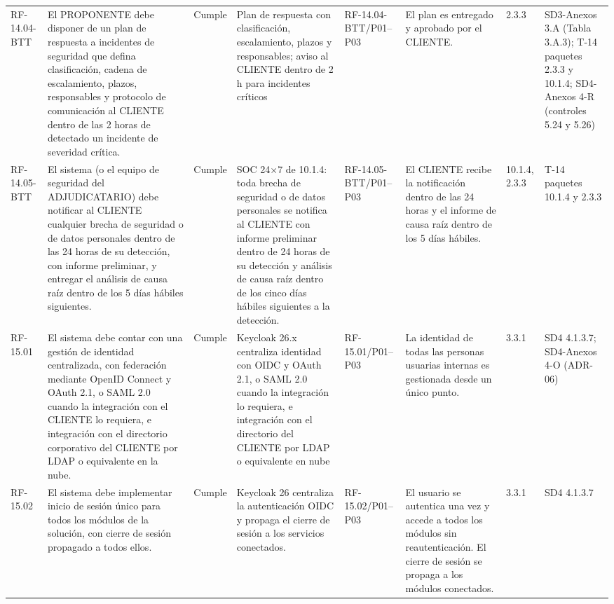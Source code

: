 \documentclass[oficio,firma,final]{lafrox}
\begin{document}
\begin{landscape}
{\begin{longtable}{@{}F{0.054} F{0.173} F{0.061} F{0.191} F{0.106} F{0.180} F{0.067} F{0.168}@{}}
  RF-14.04-BTT & El PROPONENTE debe disponer de un plan de respuesta a incidentes de seguridad que defina clasificación, cadena de escalamiento, plazos, responsables y protocolo de comunicación al CLIENTE dentro de las 2 horas de detectado un incidente de severidad crítica. & Cumple & Plan de respuesta con clasificación, escalamiento, plazos y responsables; aviso al CLIENTE dentro de 2 h para incidentes críticos & RF-14.04-BTT/\allowbreak{}P01--\allowbreak{}P03 & El plan es entregado y aprobado por el CLIENTE. & 2.3.3 & SD3-Anexos 3.A (Tabla 3.A.3); T-14 paquetes 2.3.3 y 10.1.4; SD4-Anexos 4-R (controles 5.24 y 5.26)  \\
  RF-14.05-BTT & El sistema (o el equipo de seguridad del ADJUDICATARIO) debe notificar al CLIENTE cualquier brecha de seguridad o de datos personales dentro de las 24 horas de su detección, con informe preliminar, y entregar el análisis de causa raíz dentro de los 5 días hábiles siguientes. & Cumple & SOC 24$\times$7 de 10.1.4: toda brecha de seguridad o de datos personales se notifica al CLIENTE con informe preliminar dentro de 24 horas de su detección y análisis de causa raíz dentro de los cinco días hábiles siguientes a la detección. & RF-14.05-BTT/\allowbreak{}P01--\allowbreak{}P03 & El CLIENTE recibe la notificación dentro de las 24 horas y el informe de causa raíz dentro de los 5 días hábiles. & 10.1.4, 2.3.3 & T-14 paquetes 10.1.4 y 2.3.3  \\
  RF-15.01 & El sistema debe contar con una gestión de identidad centralizada, con federación mediante OpenID Connect y OAuth 2.1, o SAML 2.0 cuando la integración con el CLIENTE lo requiera, e integración con el directorio corporativo del CLIENTE por LDAP o equivalente en la nube. & Cumple & Keycloak 26.x centraliza identidad con OIDC y OAuth 2.1, o SAML 2.0 cuando la integración lo requiera, e integración con el directorio del CLIENTE por LDAP o equivalente en nube & RF-15.01/\allowbreak{}P01--\allowbreak{}P03 & La identidad de todas las personas usuarias internas es gestionada desde un único punto. & 3.3.1 & SD4 4.1.3.7; SD4-Anexos 4-O (ADR-06)  \\
  RF-15.02 & El sistema debe implementar inicio de sesión único para todos los módulos de la solución, con cierre de sesión propagado a todos ellos. & Cumple & Keycloak 26 centraliza la autenticación OIDC y propaga el cierre de sesión a los servicios conectados. & RF-15.02/\allowbreak{}P01--\allowbreak{}P03 & El usuario se autentica una vez y accede a todos los módulos sin reautenticación. El cierre de sesión se propaga a los módulos conectados. & 3.3.1 & SD4 4.1.3.7  \\

\end{longtable}}
\end{landscape}
\end{document}
